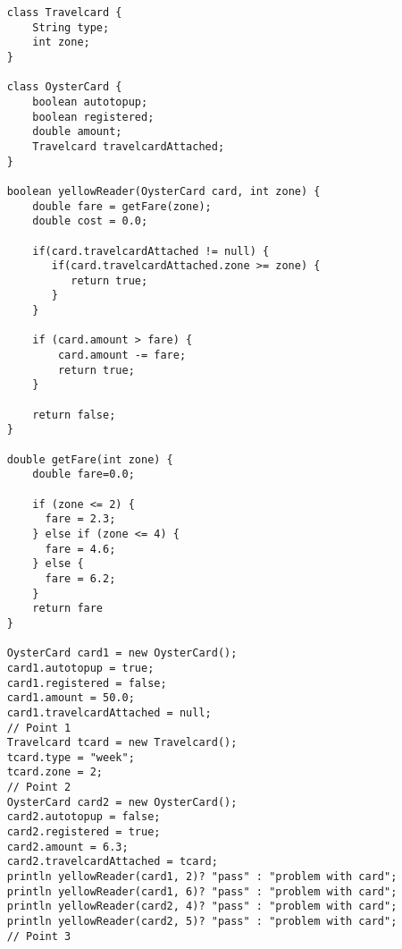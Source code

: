 \documentclass{article}
\begin{document}
\begin{verbatim}
    class Travelcard {
        String type;
        int zone;
    }
    
    class OysterCard {
        boolean autotopup;
        boolean registered;
        double amount;
        Travelcard travelcardAttached;
    }
    
    boolean yellowReader(OysterCard card, int zone) {
        double fare = getFare(zone);
        double cost = 0.0;
      
        if(card.travelcardAttached != null) {
           if(card.travelcardAttached.zone >= zone) {
              return true;
           }
        }
      
        if (card.amount > fare) {
            card.amount -= fare;
            return true;
        }
   
        return false;
    }
                  
    double getFare(int zone) {
        double fare=0.0;
      
        if (zone <= 2) {
          fare = 2.3;
        } else if (zone <= 4) {
          fare = 4.6;
        } else {
          fare = 6.2;
        }         
        return fare
    }
    
    OysterCard card1 = new OysterCard();
    card1.autotopup = true;
    card1.registered = false;
    card1.amount = 50.0;
    card1.travelcardAttached = null;
    // Point 1
    Travelcard tcard = new Travelcard();
    tcard.type = "week";
    tcard.zone = 2;
    // Point 2
    OysterCard card2 = new OysterCard();
    card2.autotopup = false;
    card2.registered = true;
    card2.amount = 6.3;
    card2.travelcardAttached = tcard;
    println yellowReader(card1, 2)? "pass" : "problem with card";
    println yellowReader(card1, 6)? "pass" : "problem with card";
    println yellowReader(card2, 4)? "pass" : "problem with card";
    println yellowReader(card2, 5)? "pass" : "problem with card";
    // Point 3
\end{verbatim}
\end{document}
